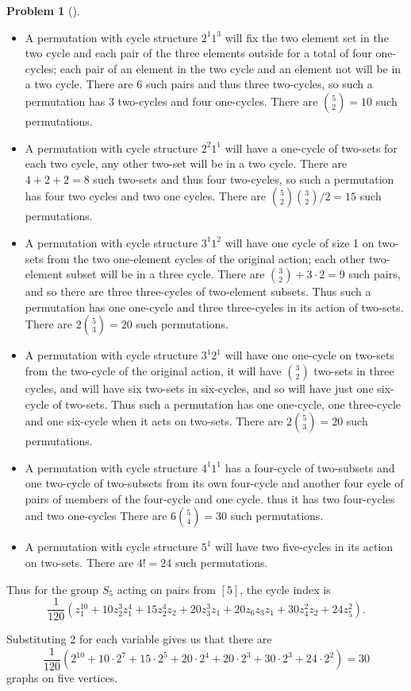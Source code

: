 \documentclass[10pt,]{book}
\theoremstyle{plain}
\theoremstyle{definition}
\newtheorem{activity}[project]{Problem}
\theoremstyle{definition}
\numberwithin{equation}{chapter}
\begin{document}
\begin{activity}[]
\begin{itemize}[label=\textbullet]
\item{}A permutation with cycle structure \(2^1 1^3\) will fix the two element set in the two cycle and each pair of the three elements outside for a total of four one-cycles; each pair of an element in the two cycle and an element not will be in a two cycle.  There are 6 such pairs and thus three two-cycles, so such a permutation has 3 two-cycles and four one-cycles.  There are \(\binom{5}{2}=10\) such permutations.%
\item{}A permutation with cycle structure \(2^2 1^1\) will have a one-cycle of two-sets for each two cycle, any other two-set will be in a  two cycle.  There are \(4+2+2=8\) such two-sets and thus four two-cycles, so such a permutation has four two cycles and two one cycles.  There are \(\binom{5}{2}\binom{3}{2}/2 =15\) such permutations.%
\item{}A permutation with cycle structure \(3^1 1^2\) will have one cycle of size 1 on two-sets from the two one-element cycles of the original action; each other two-element subset will be in a three cycle.  There are \(\binom{3}{2}+3\cdot2=9\) such pairs, and so there are three three-cycles of two-element subsets.  Thus such a permutation has one one-cycle and three three-cycles in its action of two-sets. There are \(2\binom{5}{3}=20\) such permutations.%
\item{}A permutation with cycle structure \(3^1 2^1\) will have one one-cycle on two-sets from the two-cycle of the original action, it will have \(\binom{3}{2}\)  two-sets in three cycles,  and will have six two-sets in six-cycles, and so will have just one six-cycle of two-sets.  Thus such a permutation has one one-cycle, one three-cycle and one six-cycle when it acts on two-sets.  There are \(2\binom{5}{3}=20\) such permutations.%
\item{}A permutation with cycle structure \(4^1 1^1\) has a four-cycle of two-subsets and one two-cycle of two-subsets from its own four-cycle and another four cycle of pairs of members of the four-cycle and one cycle. thus it has two four-cycles and two one-cycles There are \(6\binom{5}{4}=30\) such permutations.%
\item{}A permutation with cycle structure \(5^1\) will have two five-cycles in its action on two-sets.  There are \(4!=24\) such permutations.%
\end{itemize}
 Thus for the group \(S_5\) acting on pairs from \([5]\), the cycle index is%
\begin{equation*}
\frac{1}{120}\left(z_1^{10}+10z_2^3z_1^4+15z_2^4z_2+20z_3^3z_1+20z_6z_3z_1+
30z_4^2z_2+ 24z_5^2\right).
\end{equation*}
%
\par
Substituting 2 for each variable gives us that there are%
\begin{equation*}
\frac{1}{120}\left(2^{10}+10\cdot2^7+15\cdot2^5+20\cdot2^4+20\cdot2^3+30\cdot2^3+
24\cdot2^2\right)=30
\end{equation*}
graphs on five vertices.%
\end{activity}
\typeout{************************************************}
\typeout{************************************************}
\end{document}
